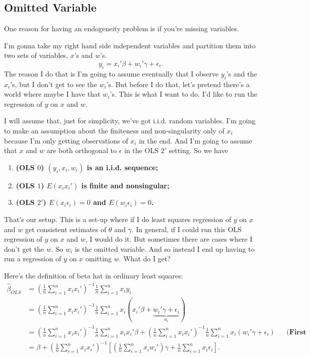 \documentclass[11pt,a4paper]{amsart}
\theoremstyle{plain}
\theoremstyle{definition}
\begin{document}
\subsection{Omitted Variable}
	 	One reason for having an endogeneity problem is if you're missing variables. \par 
	 	I'm gonna take my right hand side independent variables and partition them into two sets of variables, $x$'s and $w$'s. 
	 	\[	y_{i} = x_{i}' \beta + w_{i}' \gamma + \epsilon_{i}.	\]
	 	The reason I do that is I'm going to assume eventually that I observe $y_{i}$'s and the $x_{i}$'s, but I don't get to see the $w_{i}$'s. But before I do that,  let's pretend there's a world where maybe I have that $w_{i}$'s. This is what I want to do. I'd like to run the regression of $y$ on $x$ and $w$.\par 
	 	I will assume that, just for simplicity,  we've got i.i.d. random variables. I'm going to make an assumption about the finiteness and non-singularity only of $x_{i}$ because I'm only getting observations of $x_{i}$ in the end. And I'm going to assume that $x$ and $w$ are both orthogonal to $\epsilon$ in the OLS $2'$ setting. So we have 
	 	\begin{enumerate}
	 		\item \textbf{(OLS $0$) $(y_{i}, x_{i}, w_{i})$ is an i.i.d. sequence;}
	 		\item \textbf{(OLS $1$) $E(x_{i}x_{i}')$ is finite and nonsingular;}
	 		\item \textbf{(OLS $2'$) $E(x_{i}\epsilon_{i}) = 0$ and $E(w_{i}\epsilon_{i}) = 0$.}
	 	\end{enumerate} 
 		That's our setup. This is a set-up where if I do least squares regression of $y$ on $x$ and $w$ get consistent estimates of $\theta$ and $\gamma$. In general,  if I could run this OLS regression of $y$ on $x$ and $w$, I would do it. But sometimes there are cases where I don't get the $w$. So $w_{i}$ is the omitted variable. And so instead I end up having to run a regression of $y$ on $x$ omitting $w$. What do I get?\par 
 		Here's the definition of beta hat in ordinary least squares:
 		\[	\begin{aligned}
 				\hat{\beta}_{OLS} &= (\frac{1}{n} \sum_{i=1}^{n}x_{i}x_{i}')^{-1} \frac{1}{n}\sum_{i=1}^{n} x_{i}y_{i} \\
 				&=(\frac{1}{n} \sum_{i=1}^{n}x_{i}x_{i}')^{-1} \frac{1}{n}\sum_{i=1}^{n} x_{i}(x_{i}' \beta + \underbrace{w_{i}' \gamma + \epsilon_{i}}_{u_{i}}) \\
 				&= (\frac{1}{n} \sum_{i=1}^{n}x_{i}x_{i}')^{-1} \frac{1}{n}\sum_{i=1}^{n} x_{i}x_{i}' \beta + (\frac{1}{n} \sum_{i=1}^{n}x_{i}x_{i}')^{-1}\frac{1}{n}\sum_{i=1}^{n} x_{i}(w_{i}' \gamma + \epsilon_{i}) &&\textbf{(First term cancelled.)} 	\\
 				&= \beta + (\frac{1}{n} \sum_{i=1}^{n}x_{i}x_{i}')^{-1}[(\frac{1}{n}\sum_{i=1}^{n} x_{i}w_{i}')\gamma + \frac{1}{n}\sum_{i=1}^{n}x_{i}\epsilon_{i}]. 
 		\end{aligned}
 		\]
\end{document}
